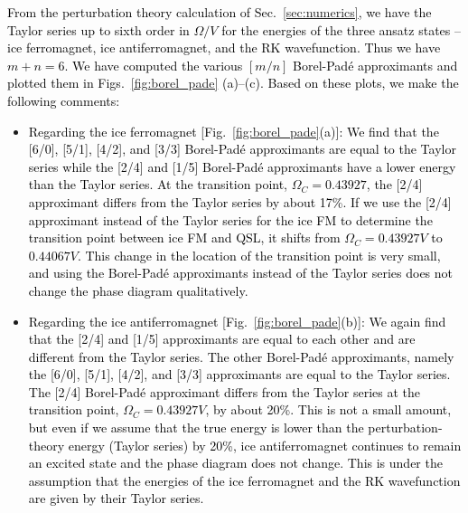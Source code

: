 \documentclass[twocolumn,superscriptaddress,amsmath,amssymb,aps,prx,nofootinbib]{revtex4-2}
\newcommand{\newtext}[1]{\textcolor{black}{#1}}
\begin{document}
\newtext{From the perturbation theory calculation of Sec.~\ref{sec:numerics}, we have the Taylor series up to sixth order in $\Omega/V$ for the energies of the three ansatz states -- ice ferromagnet, ice antiferromagnet, and the RK wavefunction. Thus we have $m+n=6$. We have computed the various $[m/n]$ Borel-Pad\'e approximants and plotted them in Figs.~\ref{fig:borel_pade} (a)--(c). Based on these plots, we make the following comments:}
\begin{itemize}
    \item \newtext{Regarding the ice ferromagnet [Fig.~\ref{fig:borel_pade}(a)]: We find that the [6/0], [5/1], [4/2],  and [3/3] Borel-Pad\'e approximants are equal to the Taylor series while the [2/4] and [1/5] Borel-Pad\'e approximants have a lower energy than the Taylor series.
    At the transition point, $\Omega_C = 0.43927$, the [2/4] approximant differs from the Taylor series by about 17\%.
    If we use the [2/4] approximant instead of the Taylor series for the ice FM to determine the transition point between ice FM and QSL, it shifts from $\Omega_C = 0.43927 V$ to $0.44067 V$. 
    This change in the location of the transition point is very small, and using the Borel-Pad\'e approximants instead of the Taylor series does not change the phase diagram qualitatively.}
    \item \newtext{Regarding the ice antiferromagnet [Fig.~\ref{fig:borel_pade}(b)]: We again find that the [2/4] and [1/5] approximants are equal to each other and are different from the Taylor series. The other Borel-Pad\'e approximants, namely the [6/0], [5/1], [4/2], and [3/3] approximants are equal to the Taylor series. The [2/4] Borel-Pad\'e approximant differs from the Taylor series at the transition point, $\Omega_C = 0.43927 V$, by about 20\%. This is not a small amount, but even if we assume that the true energy is lower than the perturbation-theory energy (Taylor series) by 20\%, ice antiferromagnet continues to remain an excited state and the phase diagram does not change. This is under the assumption that the energies of the ice ferromagnet and the RK wavefunction are given by their Taylor series.}


\end{itemize}
\end{document}
